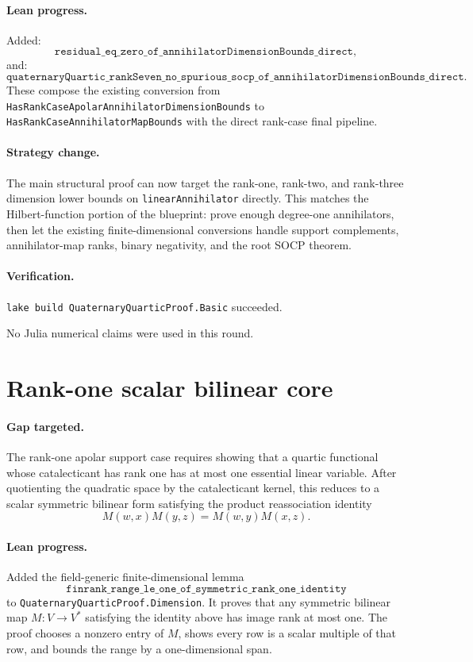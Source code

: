 \documentclass[11pt]{article}
\begin{document}
\paragraph{Lean progress.}
Added:
\[
\texttt{residual\_eq\_zero\_of\_annihilatorDimensionBounds\_direct},
\]
and:
\[
\texttt{quaternaryQuartic\_rankSeven\_no\_spurious\_socp\_of\_annihilatorDimensionBounds\_direct}.
\]
These compose the existing conversion from
\texttt{HasRankCaseApolarAnnihilatorDimensionBounds} to
\texttt{HasRankCaseAnnihilatorMapBounds} with the direct rank-case final
pipeline.

\paragraph{Strategy change.}
The main structural proof can now target the rank-one, rank-two, and rank-three
dimension lower bounds on \texttt{linearAnnihilator} directly.  This matches
the Hilbert-function portion of the blueprint: prove enough degree-one
annihilators, then let the existing finite-dimensional conversions handle
support complements, annihilator-map ranks, binary negativity, and the root
SOCP theorem.

\paragraph{Verification.}
\texttt{lake build QuaternaryQuarticProof.Basic} succeeded.

No Julia numerical claims were used in this round.

\section*{Rank-one scalar bilinear core}

\paragraph{Gap targeted.}
The rank-one apolar support case requires showing that a quartic functional
whose catalecticant has rank one has at most one essential linear variable.
After quotienting the quadratic space by the catalecticant kernel, this reduces
to a scalar symmetric bilinear form satisfying the product reassociation
identity
\[
M(w,x)M(y,z)=M(w,y)M(x,z).
\]

\paragraph{Lean progress.}
Added the field-generic finite-dimensional lemma
\[
\texttt{finrank\_range\_le\_one\_of\_symmetric\_rank\_one\_identity}
\]
to \texttt{QuaternaryQuarticProof.Dimension}.  It proves that any symmetric
bilinear map \(M:V\to V^\ast\) satisfying the identity above has image rank at
most one.  The proof chooses a nonzero entry of \(M\), shows every row is a
scalar multiple of that row, and bounds the range by a one-dimensional span.
\end{document}
